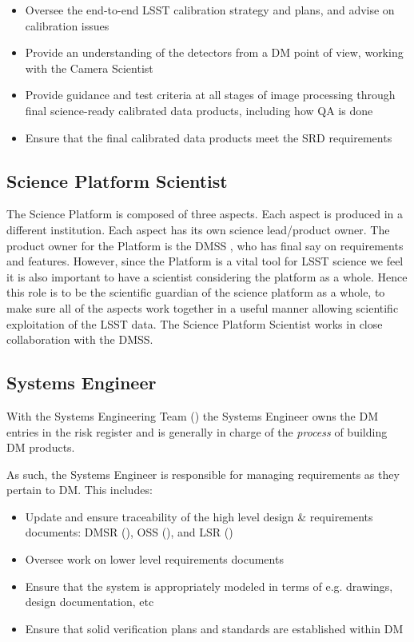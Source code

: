 \begin{itemize}
\item Oversee the end-to-end LSST calibration strategy and plans, and advise on calibration issues
\item Provide an understanding of the detectors from a DM point of view, working with the Camera Scientist
\item Provide guidance and test criteria at all stages of image processing through final science-ready calibrated data products, including how QA is done
\item Ensure that the final calibrated data products meet the SRD requirements
\end{itemize}

\subsection{Science Platform Scientist \label{role:scip}}
The Science Platform is composed of three aspects. Each aspect is produced in a different institution.
Each aspect has its own science lead/product owner.
The product owner for the Platform is the DMSS , who has final say on requirements and features.
However, since the Platform is a vital tool for LSST science we feel it is also important to have a scientist considering the platform as a whole.
Hence this role is to be the scientific guardian of the science platform as a whole, to make sure all of the aspects work together in a useful manner allowing scientific exploitation of the LSST data. The Science Platform Scientist works in close collaboration with the \gls{DMSS}.

\subsection{Systems Engineer \label{role:sysengineer}}

With the \gls{Systems Engineering} Team () the \gls{Systems Engineer} owns the DM entries in the risk register and is generally in charge of the \textit{process} of building DM products.

As such, the \gls{Systems Engineer} is responsible for managing requirements as they pertain to DM.
This includes:

\begin{itemize}
\item Update and ensure traceability of the high level design \& requirements documents: \gls{DMSR} (), \gls{OSS} (), and \gls{LSR} ()
\item Oversee work on lower level requirements documents
\item Ensure  that the system is appropriately modeled in terms of e.g. drawings, design documentation, etc
\item Ensure  that solid verification plans and standards are established within DM
\end{itemize}

